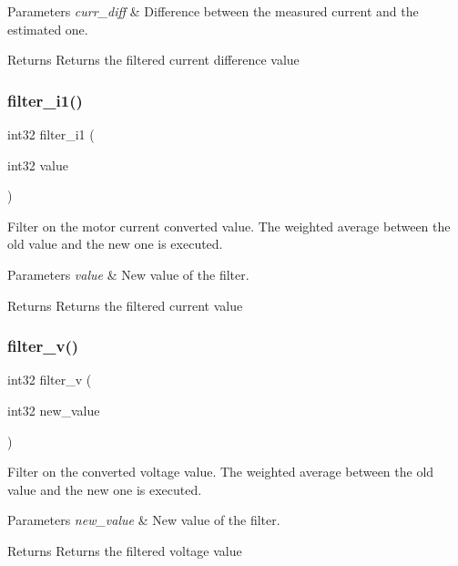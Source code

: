 \begin{DoxyParams}{Parameters}
{\em curr\+\_\+diff} & Difference between the measured current and the estimated one.\\
\hline
\end{DoxyParams}
\begin{DoxyReturn}{Returns}
Returns the filtered current difference value 
\end{DoxyReturn}
\mbox{\label{utils_8h_a3588bc1aa14c6ea245387dda7eb7ffbe}} 
\subsubsection{filter\+\_\+i1()}
{\footnotesize\ttfamily int32 filter\+\_\+i1 (\begin{DoxyParamCaption}\item[{int32}]{value }\end{DoxyParamCaption})}

Filter on the motor current converted value. The weighted average between the old value and the new one is executed.


\begin{DoxyParams}{Parameters}
{\em value} & New value of the filter.\\
\hline
\end{DoxyParams}
\begin{DoxyReturn}{Returns}
Returns the filtered current value 
\end{DoxyReturn}
\mbox{\label{utils_8h_af034fe9aa479d4adfc6e75e20b2f7ff3}} 
\subsubsection{filter\+\_\+v()}
{\footnotesize\ttfamily int32 filter\+\_\+v (\begin{DoxyParamCaption}\item[{int32}]{new\+\_\+value }\end{DoxyParamCaption})}

Filter on the converted voltage value. The weighted average between the old value and the new one is executed.


\begin{DoxyParams}{Parameters}
{\em new\+\_\+value} & New value of the filter.\\
\hline
\end{DoxyParams}
\begin{DoxyReturn}{Returns}
Returns the filtered voltage value 
\end{DoxyReturn}
\mbox{\label{utils_8h_ad378840ee71c2d41d2d4f1a84465c7f3}} 
